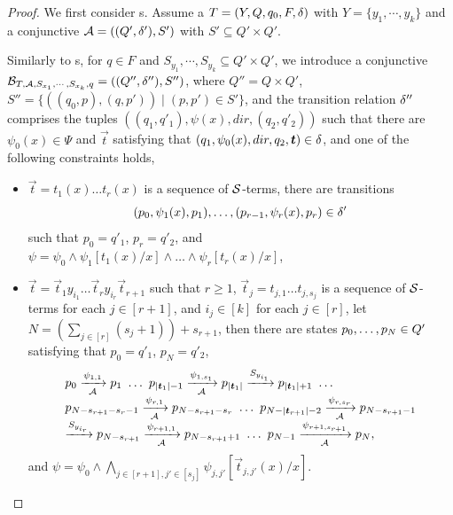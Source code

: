\begin{proof}

We first consider \SSPT{}s. Assume a \SSPT{} $T=(Y, Q, q_0, F, \delta)$ with $Y = \{y_1,\cdots, y_k\}$ and a conjunctive \SA{} $\mathcal{A} = ((Q', \delta'), S')$ with $S' \subseteq Q' \times Q'$. 

Similarly to \FFA{}s, for $q \in F$ and  $S_{y_1}, \cdots, S_{y_k} \subseteq Q' \times Q'$, we  introduce a conjunctive \SSA{} $\mathcal{B}_{T, \mathcal{A}, S_{x_1}, \cdots, S_{x_k}, q} = ((Q'', \delta''), S'')$, where $Q'' = Q \times Q'$, $S'' = \{((q_0, p), (q, p')) \mid (p, p') \in S'\}$, and the transition relation $\delta''$ comprises the tuples 
$((q_1, q'_1), \psi(x), dir, (q_2, q'_2))$ such that there are $\psi_0(x) \in \Psi$ and $\vec{t}$ satisfying that $(q_1, \psi_0(x), dir, q_2, \vec{t}) \in \transrel$, and one of the following constraints holds, 
\begin{itemize}
\item $\vec{t} = t_1(x) \ldots t_r(x)$ is a sequence of $\mathcal{S}$-terms, there are transitions 
$$(p_{0}, \psi_1(x), p_{1}), \ldots, (p_{r-1}, \psi_r(x), p_r) \in \delta'$$ 
such that $p_0 = q'_1$, $p_r = q'_2$, and $\psi = \psi_0 \wedge \psi_1[t_1(x)/x] \wedge \ldots \wedge \psi_r[t_r(x)/x]$,
%
\item $\vec{t} = \vec{t}_1 y_{i_1} \ldots \vec{t}_{r} y_{i_{r}} \vec{t}_{r+1}$ such that $r \ge 1$, $\vec{t}_j = t_{j, 1} \ldots t_{j, s_j}$ is a sequence of $\mathcal{S}$-terms for each $j \in [r+1]$,  and $i_j \in [k]$ for each $j \in [r]$, let $N = (\sum \limits_{j \in [r]} (s_j+ 1)) +s_{r+1}$, then there are states $p_0, \ldots, p_{N} \in Q'$ satisfying that $p_0 = q'_1$, $p_{N} = q'_2$,  
%
$$
\begin{array}{l}
p_0 \xrightarrow[\Aut]{\psi_{1,1}} p_1\ \ldots\ p_{|\vec{t}_1|-1} \xrightarrow[\Aut]{\psi_{1, s_1}} p_{|\vec{t}_1|} \xrightarrow{S_{y_{i_1}}} p_{|\vec{t}_1|+1}\ \ldots\\
p_{N - s_{r+1} - s_r -1} \xrightarrow[\Aut]{\psi_{r, 1}} p_{N - s_{r+1} - s_r } \ \ldots\ p_{N - |\vec{t}_{r+1}| - 2} \xrightarrow[\Aut]{\psi_{r, s_r}} p_{N-s_{r+1}-1}\\
 \xrightarrow{S_{y_{i_r}}} p_{N- s_{r+1}} \xrightarrow[\Aut]{\psi_{r+1, 1}} p_{N -s_{r+1}+1}\ \ldots\ p_{N - 1} \xrightarrow[\Aut]{\psi_{r+1,  s_{r+1}} } p_{N},
\end{array}
 $$ 
 and $\psi = \psi_0 \wedge \bigwedge \limits_{j \in [r+1], j' \in [s_j]} \psi_{j, j'} [\vec{t}_{j, j'}(x)/x].$
\end{itemize}

\end{proof}
